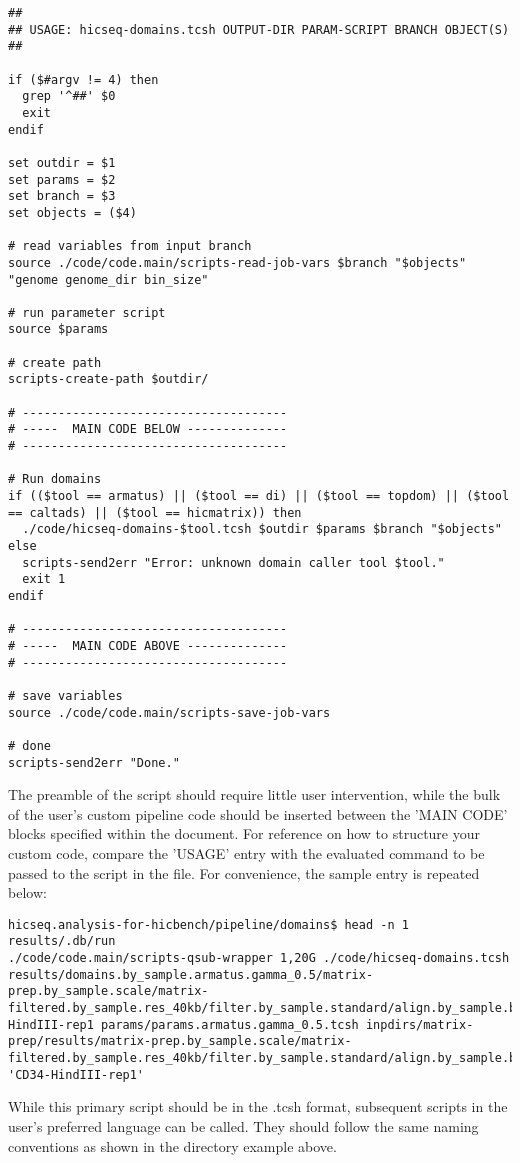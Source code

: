 \begin{enumerate}
\begin{lstlisting}
##
## USAGE: hicseq-domains.tcsh OUTPUT-DIR PARAM-SCRIPT BRANCH OBJECT(S)
##

if ($#argv != 4) then
  grep '^##' $0
  exit
endif

set outdir = $1
set params = $2
set branch = $3
set objects = ($4)

# read variables from input branch
source ./code/code.main/scripts-read-job-vars $branch "$objects" "genome genome_dir bin_size"

# run parameter script
source $params

# create path
scripts-create-path $outdir/

# -------------------------------------
# -----  MAIN CODE BELOW --------------
# -------------------------------------

# Run domains
if (($tool == armatus) || ($tool == di) || ($tool == topdom) || ($tool == caltads) || ($tool == hicmatrix)) then
  ./code/hicseq-domains-$tool.tcsh $outdir $params $branch "$objects"
else
  scripts-send2err "Error: unknown domain caller tool $tool."
  exit 1
endif

# -------------------------------------
# -----  MAIN CODE ABOVE --------------
# -------------------------------------

# save variables
source ./code/code.main/scripts-save-job-vars

# done
scripts-send2err "Done."
\end{lstlisting}
The preamble of the script should require little user intervention, while the bulk of the user's custom pipeline code should be inserted between the 'MAIN CODE' blocks specified within the document. For reference on how to structure your custom code, compare the 'USAGE' entry with the evaluated command to be passed to the script in the  file. For convenience, the sample entry is repeated below:
\begin{lstlisting}
hicseq.analysis-for-hicbench/pipeline/domains$ head -n 1 results/.db/run
./code/code.main/scripts-qsub-wrapper 1,20G ./code/hicseq-domains.tcsh results/domains.by_sample.armatus.gamma_0.5/matrix-prep.by_sample.scale/matrix-filtered.by_sample.res_40kb/filter.by_sample.standard/align.by_sample.bowtie2/CD34-HindIII-rep1 params/params.armatus.gamma_0.5.tcsh inpdirs/matrix-prep/results/matrix-prep.by_sample.scale/matrix-filtered.by_sample.res_40kb/filter.by_sample.standard/align.by_sample.bowtie2 'CD34-HindIII-rep1'
\end{lstlisting}
While this primary script should be in the .tcsh format, subsequent scripts in the user's preferred language can be called. They should follow the same naming conventions as shown in the  directory example above.
\end{enumerate}
%
\clearpage
